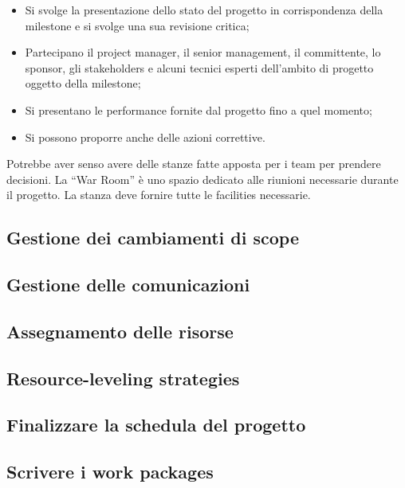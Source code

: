 \begin{itemize}
	\begin{itemize}
		\item Si svolge la presentazione dello stato del progetto in corrispondenza della milestone e si svolge una sua revisione critica;
		\item Partecipano il project manager, il senior management, il committente, lo sponsor, gli stakeholders e alcuni tecnici esperti dell’ambito di progetto oggetto della milestone;
		\item Si presentano le performance fornite dal progetto fino a quel momento;
		\item Si possono proporre anche delle azioni correttive.
	\end{itemize}
\end{itemize}
Potrebbe aver senso avere delle stanze fatte apposta per i team per prendere decisioni. La “War Room” è uno spazio dedicato alle riunioni necessarie durante il progetto. La stanza deve fornire tutte le facilities necessarie.
\subsection{Gestione dei cambiamenti di scope}

\subsection{Gestione delle comunicazioni}

\subsection{Assegnamento delle risorse}

\subsection{Resource-leveling strategies}

\subsection{Finalizzare la schedula del progetto}

\subsection{Scrivere i work packages}
